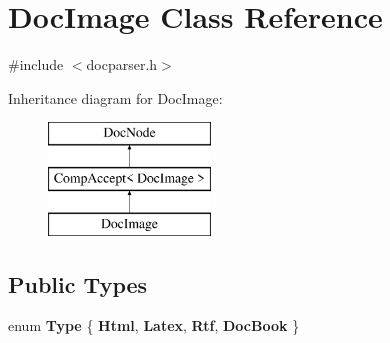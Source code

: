 \hypertarget{class_doc_image}{}\section{Doc\+Image Class Reference}
\label{class_doc_image}


{\ttfamily \#include $<$docparser.\+h$>$}

Inheritance diagram for Doc\+Image\+:\begin{figure}[H]
\begin{center}
\leavevmode
\includegraphics[height=3.000000cm]{class_doc_image}
\end{center}
\end{figure}
\subsection*{Public Types}
\begin{DoxyCompactItemize}
\item 
\mbox{\label{class_doc_image_aaa49d1dad195745ff9d470c5335be93e}} 
enum {\bfseries Type} \{ {\bfseries Html}, 
{\bfseries Latex}, 
{\bfseries Rtf}, 
{\bfseries Doc\+Book}
 \}
\end{DoxyCompactItemize}
